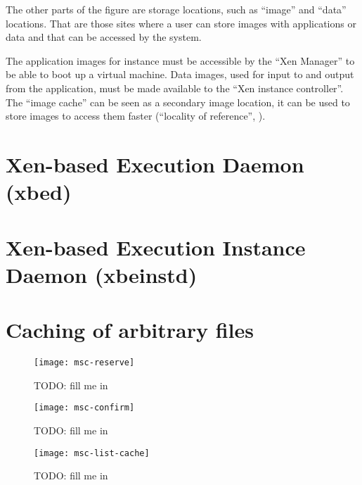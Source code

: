 The other parts of the figure are storage locations, such as ``image'' and
``data'' locations.   That are those sites  where a user  can store images
with applications  or data  and that  can be accessed  by the  system.

The  application images  for  instance  must be  accessible  by the  ``Xen
Manager'' to be able to boot  up a virtual machine.  Data images, used for
input to  and output from the  application, must be made  available to the
``Xen  instance  controller''.  The  ``image  cache''  can  be seen  as  a
secondary image  location, it can be  used to store images  to access them
faster (``locality of reference'', \cite{locality-principle}).

\section[Xen-based Execution Daemon]{Xen-based Execution Daemon (xbed)}
\label{sec:xbed}

\section[Xen-based Execution Instance Daemon]{Xen-based Execution Instance Daemon (xbeinstd)}
\label{sec:xbeinstd}

\section{Caching of arbitrary files}
\label{sec:caching}

\begin{figure}
  \begin{center}
    \texttt{[image: msc-reserve]}
  \end{center}
  \caption[MSC Make Reservation]{TODO: fill me in}
  \label{fig:msc-reserve}
\end{figure}

\begin{figure}
  \begin{center}
    \texttt{[image: msc-confirm]}
  \end{center}
  \caption[MSC Confirm Reservation]{TODO: fill me in}
  \label{fig:msc-confirm}
\end{figure}

\begin{figure}
  \begin{center}
    \texttt{[image: msc-list-cache]}
  \end{center}
  \caption[MSC List Cache Entries]{TODO: fill me in}
  \label{fig:msc-list-cache}
\end{figure}

